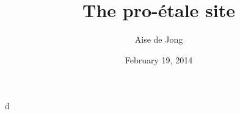 \documentclass{article}
\title{The pro-\'etale site}
\author{Aise de Jong}
\date{February 19, 2014}
\begin{document}
\maketitle





d
\end{document}
